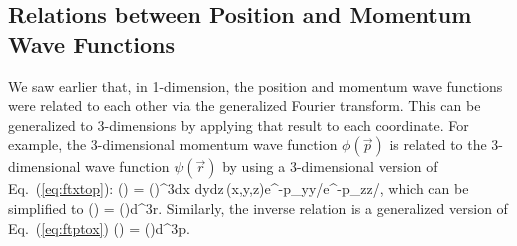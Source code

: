 \subsection{Relations between Position and Momentum Wave Functions}

We saw earlier that, in 1-dimension, the position and momentum wave functions were related to each  other via the generalized Fourier transform.    This can be generalized to 3-dimensions by applying that result to each coordinate.  For example, the 3-dimensional momentum wave function $\phi(\vec{p})$ is related to the 3-dimensional wave function $\psi(\vec{r})$ by using a 3-dimensional version of Eq.~(\ref{eq:ftxtop}):
\beq
\phi() = \left(\right)^{3}\intii dx \intii dy\intii dz\,\psi(x,y,z)e^{-\I p_{y}y/\hbar}e^{-\I p_{z}z/\hbar},
\eeq
%
which can be simplified to
%
\beq
\displaystyle \phi() = \int \psi()d^{3}r.
\label{phi psi relation}
\eeq\marginnote[-1cm]{\ref{tool:FTtool}}
%
Similarly, the inverse relation is a generalized version of Eq.~(\ref{eq:ftptox})%
\beq
\displaystyle \psi() = \int \phi()d^{3}p.
\eeq\marginnote[-0.8cm]{\ref{tool:FTtool}}
%

